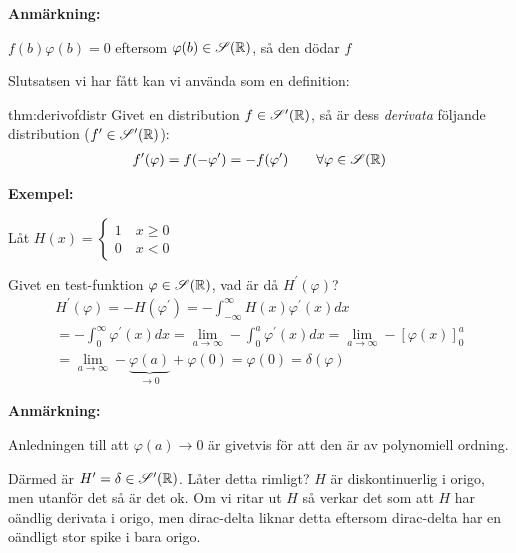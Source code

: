 \par\bigskip
\noindent\textbf{Anmärkning:}\par
\noindent $f(b)\varphi(b)=0$ eftersom $\varphi(b)\in\mathscr{S}(\mathbb{R})$, så den dödar $f$
\par\bigskip
\noindent Slutsatsen vi har fått kan vi använda som en definition:
\par\bigskip
\begin{theo}{thm:derivofdistr}
  Givet en distribution $f\in\mathscr{S}^{\prime}(\mathbb{R})$, så är dess \textit{derivata} följande distribution ($f^{\prime}\in\mathscr{S}^{\prime}(\mathbb{R})$):
  \begin{equation*}
    \begin{gathered}
      f^{\prime}(\varphi) = f(-\varphi^{\prime}) = -f(\varphi^{\prime})\qquad\forall\varphi\in\mathscr{S}(\mathbb{R})
    \end{gathered}
  \end{equation*}
\end{theo}
\par\bigskip
\noindent\textbf{Exempel:}\par
\noindent Låt $H(x) = \begin{cases}1\quad x\geq0\\0\quad x<0\end{cases}$\par
\noindent Givet en test-funktion $\varphi\in\mathscr{S}(\mathbb{R})$, vad är då $H^{\prime}(\varphi)$?
\begin{equation*}
  \begin{gathered}
    H^{\prime}(\varphi) = -H(\varphi^{\prime}) = -\int_{-\infty}^{\infty}H(x)\varphi^{\prime}(x)dx\\
    = -\int_{0}^{\infty}\varphi^{\prime}(x)dx = \lim_{a\to\infty}-\int_{0}^{a}\varphi^{\prime}(x)dx = \lim_{a\to\infty}-[\varphi(x)]_0^a\\
    =\lim_{a\to\infty}-\underbrace{\varphi(a)}_{\text{$\to0$}}+\varphi(0)=\varphi(0)=\delta(\varphi)
  \end{gathered}
\end{equation*}\par
\noindent\textbf{Anmärkning:}\par
\noindent Anledningen till att $\varphi(a)\to0$ är givetvis för att den är av polynomiell ordning.
\par\bigskip
\noindent Därmed är $H^{\prime} = \delta\in\mathscr{S}^{\prime}(\mathbb{R})$. Låter detta rimligt? $H$ är diskontinuerlig i origo, men utanför det så är det ok. Om vi ritar ut $H$ så verkar det som att $H$ har oändlig derivata i origo, men dirac-delta liknar detta eftersom dirac-delta har en oändligt stor spike i bara origo. 
